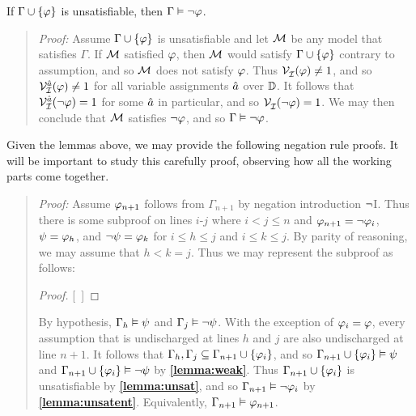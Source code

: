 \begin{Lthm} \label{lemma:unsatent}
  If $\Gamma \cup \lbrace\varphi\rbrace$ is unsatisfiable, then $\Gamma \vDash \neg\varphi$.
\end{Lthm}

\begin{quote} 
  \textit{Proof:} Assume $\Gamma \cup \lbrace\varphi\rbrace$ is unsatisfiable and let $\mathcal{M}$ be any model that satisfies $\Gamma$. 
  If $\mathcal{M}$ satisfied $\varphi$, then $\mathcal{M}$ would satisfy $\Gamma \cup \lbrace\varphi\rbrace$ contrary to assumption, and so $\mathcal{M}$ does not satisfy $\varphi$.
  Thus $\mathcal{V}_{\mathcal{I}}^{}(\varphi)\neq 1$, and so $\mathcal{V}_{\mathcal{I}}^{\hat{a}}(\varphi)\neq 1$ for all variable assignments $\hat{a}$ over $\mathbb{D}$.
  It follows that $\mathcal{V}_{\mathcal{I}}^{\hat{a}}(\neg\varphi)= 1$ for some $\hat{a}$ in particular, and so $\mathcal{V}_{\mathcal{I}}^{}(\neg\varphi)= 1$.
  We may then conclude that $\mathcal{M}$ satisfies $\neg\varphi$, and so $\Gamma \vDash \neg\varphi$.
\end{quote}

Given the lemmas above, we may provide the following negation rule proofs.
It will be important to study this carefully proof, observing how all the working parts come together.



\begin{quote} 
  \textit{Proof:} Assume $\varphi_{n+1}$ follows from $\Gamma_{n+1}$ by negation introduction $\neg$I.
  Thus there is some subproof on lines $i$-$j$ where $i<j\leq n$ and $\varphi_{n+1}=\neg\varphi_i$, $\psi=\varphi_h$, and $\neg\psi=\varphi_k$ for $i\leq h\leq j$ and $i\leq k\leq j$.
  By parity of reasoning, we may assume that $h<k=j$.
  Thus we may represent the subproof as follows:

  \begin{proof}
  \open
    \metaA {}
    \metaB
  \close
  [\ ]{\enot\metaA} %
  \end{proof}

  By hypothesis, $\Gamma_h \vDash \psi$ and $\Gamma_j \vDash \neg\psi$.
  With the exception of $\varphi_i=\varphi$, every assumption that is undischarged at lines $h$ and $j$ are also undischarged at line $n+1$.
  It follows that $\Gamma_h,\Gamma_j\subseteq\Gamma_{n+1}\cup\lbrace\varphi_i\rbrace$, and so $\Gamma_{n+1}\cup\lbrace\varphi_i\rbrace \vDash \psi$ and $\Gamma_{n+1}\cup\lbrace\varphi_i\rbrace \vDash \neg\psi$ by \textbf{\ref{lemma:weak}}.
  Thus $\Gamma_{n+1}\cup\lbrace\varphi_i\rbrace$ is unsatisfiable by \textbf{\ref{lemma:unsat}}, and so $\Gamma_{n+1} \vDash \neg\varphi_i$ by \textbf{\ref{lemma:unsatent}}.
  Equivalently, $\Gamma_{n+1} \vDash \varphi_{n+1}$.
\end{quote}


